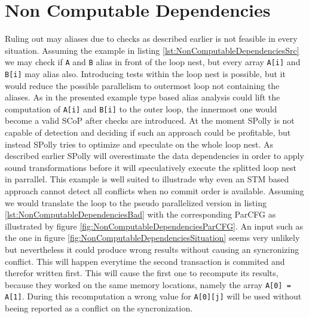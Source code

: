 \section{Non Computable Dependencies}
\label{NonComputableDependencies}
Ruling out may aliases due to checks as described earlier is not feasible in every
situation. Assuming the example in listing \ref{lst:NonComputableDependenciesSrc}
we may check if \texttt{A} and \texttt{B} alias in front of the loop nest, but
every array \texttt{A[i]} and \texttt{B[i]} may alias also. Introducing tests 
within the loop nest is possible, but it would reduce the possible parallelism
to outermost loop not containing the aliases. As in the presented example type
based alias analysis could lift the computation of \texttt{A[i]} and \texttt{B[i]} 
to the outer loop, the innermost one would become a valid SCoP after checks are
introduced. At the moment SPolly is not capable of detection and deciding if 
such an approach could be profitable, but instead SPolly tries to optimize and 
speculate on the whole loop nest. As described earlier SPolly will overestimate
the data dependencies in order to apply sound transformations before it will 
speculatively execute the splitted loop nest in parrallel. This example is well
suited to illustrade why even an STM based approach cannot detect all conflicts
when no commit order is available. Assuming we would 
translate the loop to the pseudo parallelized version in listing 
\ref{lst:NonComputableDependenciesBad} with the corresponding ParCFG as illustrated 
by figure \ref{fig:NonComputableDependenciesParCFG}. An input such as the one 
in figure \ref{fig:NonComputableDependenciesSituation} seems very unlikely but 
nevertheless it could produce wrong results without causing an syncronizing 
conflict. This will happen everytime the second transaction is commited and 
therefor written first. This will cause the first one to recompute its results, 
because they worked on the same memory locations, namely the array \texttt{A[0] = A[1]}.
During this recomputation a wrong value for \texttt{A[0][j]} will be used without
beeing reported as a conflict on the syncronization. 

